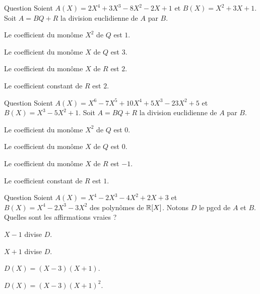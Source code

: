 \begin{multi}[multiple,feedback=
{Faire le calcul !
\(Q(X) = 2X^2-3X-1\), \(R(X) = 4X+2\).
}]{Question}
Soient \(A(X) = 2 X^4 + 3 X^3 - 8 X^2 - 2 X + 1\) et \(B(X) = X^2+3X+1\). Soit \(A = BQ+R\) la division euclidienne de \(A\) par \(B\).

    \item Le coefficient du monôme \(X^2\) de \(Q\) est \(1\).
    \item Le coefficient du monôme \(X\) de \(Q\) est \(3\).
    \item Le coefficient du monôme \(X\) de \(R\) est \(2\).
    \item* Le coefficient constant de \(R\) est \(2\).
\end{multi}


\begin{multi}[multiple,feedback=
{Faire le calcul !
\(Q(X) = X^3-2X^2+4\), \(R(X) = -X^2+1\).
}]{Question}
Soient \(A(X) = X^6 - 7 X^5 + 10 X^4 + 5 X^3 - 23 X^2 + 5\) et \(B(X) = X^3-5X^2+1\). Soit \(A = BQ+R\) la division euclidienne de \(A\) par \(B\).

    \item Le coefficient du monôme \(X^2\) de \(Q\) est \(0\).
    \item* Le coefficient du monôme \(X\) de \(Q\) est \(0\).
    \item Le coefficient du monôme \(X\) de \(R\) est \(-1\).
    \item* Le coefficient constant de \(R\) est \(1\).
\end{multi}


\begin{multi}[multiple,feedback=
{\(A(X) = (X-3)(X+1)^2(X-1)\), \(B(X) = X^2(X-3)(X+1)\),
le pgcd est \(D = (X-3)(X+1)\). 
}]{Question}
Soient \(A(X) = X^4 - 2 X^3 - 4 X^2 + 2 X + 3\) et 
\(B(X) = X^4 - 2 X^3 - 3 X^2\) des polynômes de \(\mathbb{R}[X]\).
Notons \(D\) le pgcd de \(A\) et \(B\).
Quelles sont les affirmations vraies  ?

    \item \(X-1\) divise \(D\).
    \item* \(X+1\) divise \(D\).
    \item* \(D(X) = (X-3)(X+1)\).
    \item \(D(X) = (X-3)(X+1)^2\).
\end{multi}


